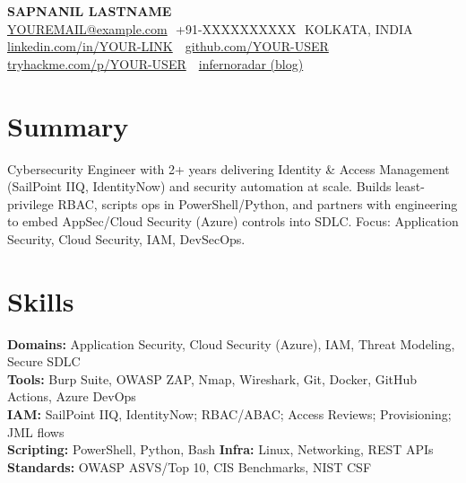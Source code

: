 \documentclass[11pt]{article}
\newcommand{\sep}{\,\textbar\,}
\begin{document}
\begin{center}
  {\LARGE \textbf{SAPNANIL LASTNAME}}\\[4pt]
  \href{mailto:YOUREMAIL@example.com}{YOUREMAIL@example.com} \sep +91-XXXXXXXXXX \sep KOLKATA, INDIA \\[1pt]
  \href{https://www.linkedin.com/in/YOUR-LINK}{linkedin.com/in/YOUR-LINK} \sep
  \href{https://github.com/YOUR-USER}{github.com/YOUR-USER} \sep
  \href{https://tryhackme.com/p/YOUR-USER}{tryhackme.com/p/YOUR-USER} \sep
  \href{https://infernoradar.example}{infernoradar (blog)}
\end{center}

\section*{Summary}
Cybersecurity Engineer with 2+ years delivering Identity \& Access Management (SailPoint IIQ, IdentityNow) and security automation at scale. Builds least-privilege RBAC, scripts ops in PowerShell/Python, and partners with engineering to embed AppSec/Cloud Security (Azure) controls into SDLC. Focus: Application Security, Cloud Security, IAM, DevSecOps.

\section*{Skills}
\textbf{Domains:} Application Security, Cloud Security (Azure), IAM, Threat Modeling, Secure SDLC\\
\textbf{Tools:} Burp Suite, OWASP ZAP, Nmap, Wireshark, Git, Docker, GitHub Actions, Azure DevOps\\
\textbf{IAM:} SailPoint IIQ, IdentityNow; RBAC/ABAC; Access Reviews; Provisioning; JML flows\\
\textbf{Scripting:} PowerShell, Python, Bash \quad \textbf{Infra:} Linux, Networking, REST APIs\\
\textbf{Standards:} OWASP ASVS/Top 10, CIS Benchmarks, NIST CSF

\end{document}
